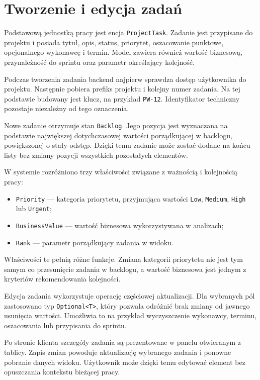 \section{Tworzenie i edycja zadań}

Podstawową jednostką pracy jest encja \texttt{ProjectTask}. Zadanie jest przypisane do projektu i posiada tytuł, opis, status, priorytet, oszacowanie punktowe, opcjonalnego wykonawcę i termin. Model zawiera również wartość biznesową, przynależność do sprintu oraz parametr określający kolejność.

Podczas tworzenia zadania backend najpierw sprawdza dostęp użytkownika do projektu. Następnie pobiera prefiks projektu i kolejny numer zadania. Na tej podstawie budowany jest klucz, na przykład \texttt{PW-12}. Identyfikator techniczny pozostaje niezależny od tego oznaczenia.

Nowe zadanie otrzymuje stan \texttt{Backlog}. Jego pozycja jest wyznaczana na podstawie największej dotychczasowej wartości porządkującej w backlogu, powiększonej o stały odstęp. Dzięki temu zadanie może zostać dodane na końcu listy bez zmiany pozycji wszystkich pozostałych elementów.

W systemie rozróżniono trzy właściwości związane z ważnością i kolejnością pracy:

\begin{itemize}
    \item \texttt{Priority} --- kategoria priorytetu, przyjmująca wartości \texttt{Low}, \texttt{Medium}, \texttt{High} lub \texttt{Urgent};
    \item \texttt{BusinessValue} --- wartość biznesowa wykorzystywana w analizach;
    \item \texttt{Rank} --- parametr porządkujący zadania w widoku.
\end{itemize}

Właściwości te pełnią różne funkcje. Zmiana kategorii priorytetu nie jest tym samym co przesunięcie zadania w backlogu, a wartość biznesowa jest jednym z kryteriów rekomendowania kolejności.

Edycja zadania wykorzystuje operację częściowej aktualizacji. Dla wybranych pól zastosowano typ \texttt{Optional<T>}, który pozwala odróżnić brak zmiany od jawnego usunięcia wartości. Umożliwia to na przykład wyczyszczenie wykonawcy, terminu, oszacowania lub przypisania do sprintu.

Po stronie klienta szczegóły zadania są prezentowane w panelu otwieranym z tablicy. Zapis zmian powoduje aktualizację wybranego zadania i ponowne pobranie danych widoku. Użytkownik może dzięki temu edytować element bez opuszczania kontekstu bieżącej pracy.

